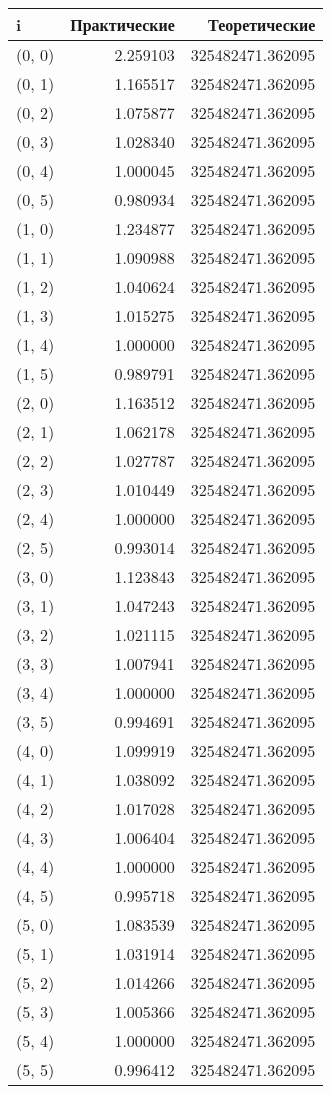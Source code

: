 \begin{tabular}{lrr}
\toprule
i & Практические & Теоретические \\
\midrule
(0, 0) & 2.259103 & 325482471.362095 \\
(0, 1) & 1.165517 & 325482471.362095 \\
(0, 2) & 1.075877 & 325482471.362095 \\
(0, 3) & 1.028340 & 325482471.362095 \\
(0, 4) & 1.000045 & 325482471.362095 \\
(0, 5) & 0.980934 & 325482471.362095 \\
(1, 0) & 1.234877 & 325482471.362095 \\
(1, 1) & 1.090988 & 325482471.362095 \\
(1, 2) & 1.040624 & 325482471.362095 \\
(1, 3) & 1.015275 & 325482471.362095 \\
(1, 4) & 1.000000 & 325482471.362095 \\
(1, 5) & 0.989791 & 325482471.362095 \\
(2, 0) & 1.163512 & 325482471.362095 \\
(2, 1) & 1.062178 & 325482471.362095 \\
(2, 2) & 1.027787 & 325482471.362095 \\
(2, 3) & 1.010449 & 325482471.362095 \\
(2, 4) & 1.000000 & 325482471.362095 \\
(2, 5) & 0.993014 & 325482471.362095 \\
(3, 0) & 1.123843 & 325482471.362095 \\
(3, 1) & 1.047243 & 325482471.362095 \\
(3, 2) & 1.021115 & 325482471.362095 \\
(3, 3) & 1.007941 & 325482471.362095 \\
(3, 4) & 1.000000 & 325482471.362095 \\
(3, 5) & 0.994691 & 325482471.362095 \\
(4, 0) & 1.099919 & 325482471.362095 \\
(4, 1) & 1.038092 & 325482471.362095 \\
(4, 2) & 1.017028 & 325482471.362095 \\
(4, 3) & 1.006404 & 325482471.362095 \\
(4, 4) & 1.000000 & 325482471.362095 \\
(4, 5) & 0.995718 & 325482471.362095 \\
(5, 0) & 1.083539 & 325482471.362095 \\
(5, 1) & 1.031914 & 325482471.362095 \\
(5, 2) & 1.014266 & 325482471.362095 \\
(5, 3) & 1.005366 & 325482471.362095 \\
(5, 4) & 1.000000 & 325482471.362095 \\
(5, 5) & 0.996412 & 325482471.362095 \\
\bottomrule
\end{tabular}
